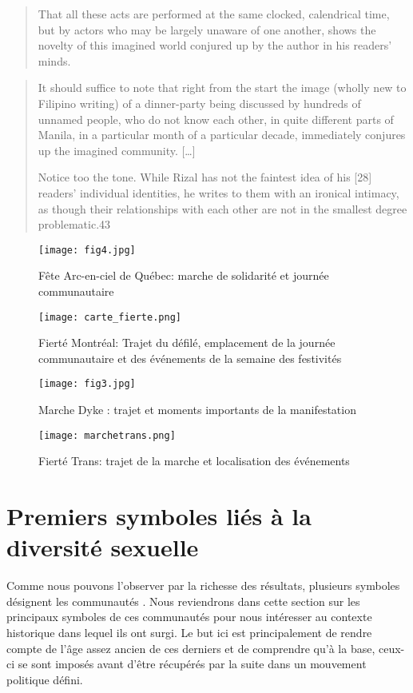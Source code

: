 \begin{quote}
That all these acts are performed at the same clocked, calendrical time, but by actors who may be largely unaware of one another, shows the novelty of this imagined world conjured up by the author in his readers’ minds.
\citep[26]{Anderson1983}
\end{quote}

\begin{quote}

It should suffice to note that right from the start the image (wholly new to Filipino writing) of a dinner-party being discussed by hundreds of unnamed people, who do not know each other, in quite different parts of Manila, in a particular month of a particular decade, immediately conjures up the imagined community.
[\ldots]

Notice too the tone.
While Rizal has not the faintest idea of his [28] readers’ individual identities, he writes to them with an ironical intimacy, as though their relationships with each other are not in the smallest degree problematic.43
\end{quote}

\begin{figure}[ht]
	\centering
	\texttt{[image: fig4.jpg]}
	\caption{Fête Arc-en-ciel de Québec: marche de solidarité et journée
    communautaire}
	\label{fig:figure4}
\end{figure}

\begin{figure}[ht]
	\centering
	\texttt{[image: carte\_fierte.png]}
	\caption[]{Fierté Montréal: Trajet du défilé, emplacement de la journée communautaire et des événements de la semaine des festivités}
	\label{fig:carte_fierte}
\end{figure}

\begin{figure}[ht]
	\centering
	\texttt{[image: fig3.jpg]}
	\caption[]{Marche Dyke : trajet et moments importants de la manifestation}
	\label{fig:figure3}
\end{figure}

\begin{figure}[ht]
	\centering
	\texttt{[image: marchetrans.png]}
	\caption[]{Fierté Trans: trajet de la marche et localisation des événements}
	\label{fig:marchetrans}
\end{figure}

\section{Premiers symboles liés à la diversité sexuelle}
\label{sec:premiers_symboles_li_s_la_diversit_sexuelle}
Comme nous pouvons l'observer par la richesse des résultats, plusieurs symboles désignent les communautés \lgbt{}.
Nous reviendrons dans cette section sur les principaux symboles de ces communautés pour nous intéresser au contexte historique dans lequel ils ont surgi.
Le but ici est principalement de rendre compte de l'âge assez ancien de ces derniers et de comprendre qu'à la base, ceux-ci se sont imposés avant d'être récupérés par la suite dans un mouvement politique défini.

